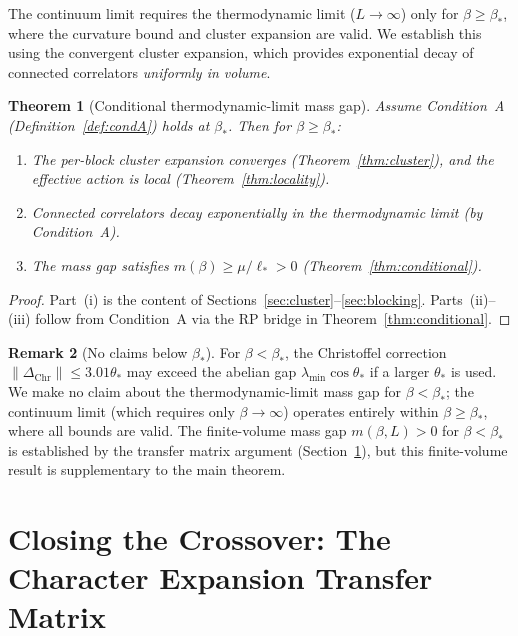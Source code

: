 \documentclass[11pt]{article}
\newtheorem{theorem}{Theorem}[section]
\theoremstyle{definition}
\newtheorem{remark}[theorem]{Remark}
\begin{document}
The continuum limit requires the thermodynamic limit ($L\to\infty$)
only for $\beta\ge\beta_*$, where the curvature bound and cluster
expansion are valid.  We establish this using the convergent
cluster expansion, which provides exponential decay of connected
correlators \emph{uniformly in volume}.

\begin{theorem}[Conditional thermodynamic-limit mass gap]
\label{thm:extended}
Assume Condition~A (Definition~\ref{def:condA}) holds at $\beta_*$.
Then for $\beta\ge\beta_*$:
\begin{enumerate}[nosep,label=(\roman*)]
\item The per-block cluster expansion converges
(Theorem~\ref{thm:cluster}), and the effective action is
local (Theorem~\ref{thm:locality}).
\item Connected correlators decay exponentially in the
thermodynamic limit (by Condition~A).
\item The mass gap satisfies
$m(\beta)\ge\mu/\ell_*>0$
(Theorem~\ref{thm:conditional}).
\end{enumerate}
\end{theorem}

\begin{proof}
Part~(i) is the content of
Sections~\ref{sec:cluster}--\ref{sec:blocking}.
Parts~(ii)--(iii) follow from Condition~A via the RP
bridge in Theorem~\ref{thm:conditional}.
\end{proof}

\begin{remark}[No claims below $\beta_*$]
For $\beta<\beta_*$, the Christoffel correction
$\|\Delta_{\mathrm{Chr}}\|\le 3.01\theta_*$ may exceed the abelian
gap $\lambda_{\min}\cos\theta_*$ if a larger $\theta_*$ is used.
We make no claim about the thermodynamic-limit mass gap for
$\beta<\beta_*$; the continuum limit (which requires only $\beta\to\infty$)
operates entirely within $\beta\ge\beta_*$, where all bounds are valid.
The finite-volume mass gap $m(\beta,L)>0$ for $\beta<\beta_*$ is
established by the transfer matrix argument
(Section~\ref{sec:crossover}), but this finite-volume result is
supplementary to the main theorem.
\end{remark}

\section{Closing the Crossover: The Character Expansion
Transfer Matrix}\label{sec:crossover}
\end{document}
